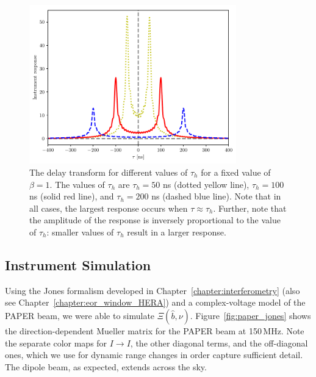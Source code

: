 \begin{figure}
\centering
\includegraphics[width=0.8\textwidth]{chapters/global_signal/figures/vg_th.pdf}
\caption[The delay transform for different values of $\tau_h$.]{
    The delay transform for different values of $\tau_h$ for a fixed
    value of $\beta = 1$. The values of $\tau_h$ are $\tau_h = 50$ ns (dotted
    yellow line), $\tau_h = 100$ ns (solid red line), and $\tau_h = 200$ ns
    (dashed blue line). Note that in all cases, the largest response occurs when
    $\tau \approx \tau_h$. Further, note that the amplitude of the response is
    inversely proportional to the value of $\tau_h$: smaller values of $\tau_h$
    result in a larger response.}
\label{fig:vg_tau_three}
\end{figure}

\subsection{Instrument Simulation}
Using the Jones formalism developed in Chapter~\ref{chapter:interferometry} (also see Chapter~\ref{chapter:eor_window_HERA}) and a complex-voltage model of the PAPER \citep[e.g.][]{Parsons.10} beam, we were able to simulate $\Xi(\hat{b},\nu)$. Figure~\ref{fig:paper_jones} shows the direction-dependent Mueller matrix for the PAPER beam at 150\,MHz. Note the separate color maps for $I\rightarrow I$, the other diagonal terms, and the off-diagonal ones, which we use for dynamic range changes in order capture sufficient detail. The dipole beam, as expected, extends across the sky.

